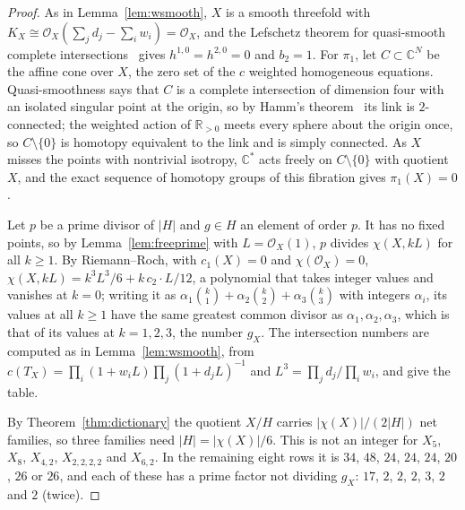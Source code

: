 \documentclass[11pt]{amsart}
\theoremstyle{definition}
\theoremstyle{remark}
\newcommand{\R}{\mathbb{R}}
\newcommand{\C}{\mathbb{C}}
\newcommand{\cO}{\mathcal{O}}
\begin{document}
\begin{proof}
As in Lemma~\ref{lem:wsmooth}, $X$ is a smooth threefold with $K_X\cong
\cO_X(\sum_jd_j-\sum_iw_i)=\cO_X$, and the Lefschetz theorem for
quasi-smooth complete intersections~\cite{Dol82} gives $h^{1,0}=h^{2,0}=0$
and $b_2=1$. For $\pi_1$, let $C\subset\C^{N}$ be the affine cone over $X$,
the zero set of the $c$ weighted homogeneous equations. Quasi-smoothness
says that $C$ is a complete intersection of dimension four with an isolated
singular point at the origin, so by Hamm's theorem~\cite{Ham71} its link
is $2$-connected; the weighted action of $\R_{>0}$ meets every sphere about
the origin once, so $C\setminus\{0\}$ is homotopy equivalent to the link and
is simply connected. As $X$ misses the points with nontrivial isotropy,
$\C^*$ acts freely on $C\setminus\{0\}$ with quotient $X$, and the exact
sequence of homotopy groups of this fibration gives $\pi_1(X)=0$.

Let $p$ be a prime divisor of $|H|$ and $g\in H$ an element of order $p$.
It has no fixed points, so by Lemma~\ref{lem:freeprime} with
$L=\cO_X(1)$, $p$ divides $\chi(X,kL)$ for all $k\ge1$. By Riemann--Roch,
with $c_1(X)=0$ and $\chi(\cO_X)=0$,
$\chi(X,kL)=k^3L^3/6+k\,c_2\cdot L/12$, a polynomial that takes integer
values and vanishes at $k=0$; writing it as $\alpha_1\binom k1+\alpha_2
\binom k2+\alpha_3\binom k3$ with integers $\alpha_i$, its values at all
$k\ge1$ have the same greatest common divisor as $\alpha_1,\alpha_2,
\alpha_3$, which is that of its values at $k=1,2,3$, the number $g_X$. The
intersection numbers are computed as in Lemma~\ref{lem:wsmooth}, from
$c(T_X)=\prod_i(1+w_iL)\prod_j(1+d_jL)^{-1}$ and
$L^3=\prod_jd_j/\prod_iw_i$, and give the table.

By Theorem~\ref{thm:dictionary} the quotient $X/H$ carries
$|\chi(X)|/(2|H|)$ net families, so three families need
$|H|=|\chi(X)|/6$. This is not an integer for $X_5$, $X_8$, $X_{4,2}$,
$X_{2,2,2,2}$ and $X_{6,2}$. In the remaining eight rows it is $34$, $48$,
$24$, $24$, $24$, $20$, $26$ or $26$, and each of these has a prime factor
not dividing $g_X$: $17$, $2$, $2$, $2$, $3$, $2$ and $2$ (twice).
\end{proof}
\end{document}
